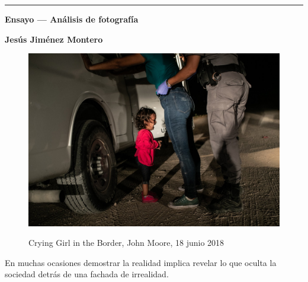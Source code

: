 \documentclass[11pt]{article}
\begin{document}
\begin{titlepage}

	\centering
	\hrule
	\vspace{1cm}
	{\bfseries\Huge Ensayo --- Análisis de fotografía \par}
	\vspace{0.5cm}
	\large{\textbf{Jesús Jiménez Montero} \par}

	\vspace{1cm}

	\begin{figure}[H]

		\includegraphics[width=\textwidth,height=\textheight,keepaspectratio]{Images/WPPF-2019PhotoContest-POYNominee-JohnMoore.jpg}
		\caption{{Crying Girl in the Border, John Moore, 18 junio 2018}}\cite{moore-2018}
		\label{fig:foto}

	\end{figure}

	\vspace{0.5cm}

	\vspace{1cm}
	\hrulefill
\end{titlepage}
\newpage

\renewcommand{\listfigurename}{\textbf{Lista de figuras}}


\listoffigures
\newpage


En muchas ocasiones demostrar la realidad implica revelar lo que oculta la sociedad detrás de una fachada de irrealidad. \newline
\end{document}
